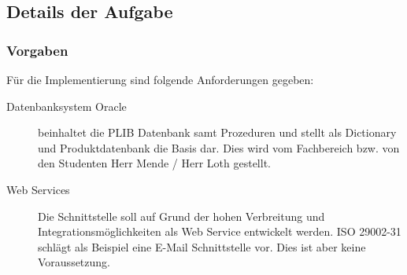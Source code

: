 \subsection{Details der Aufgabe}

\subsubsection{Vorgaben}

Für die Implementierung sind folgende Anforderungen gegeben:
\begin{description}
\item[Datenbanksystem Oracle] beinhaltet die PLIB Datenbank samt Prozeduren und stellt als Dictionary und Produktdatenbank die Basis dar. Dies wird vom Fachbereich bzw. von den Studenten Herr Mende / Herr Loth gestellt. 
\item[Web Services] Die Schnittstelle soll auf Grund der hohen Verbreitung und Integrationsmöglichkeiten als Web Service entwickelt werden. ISO 29002-31 schlägt als Beispiel eine E-Mail Schnittstelle vor.  Dies ist aber keine Voraussetzung. 
\end{description}


